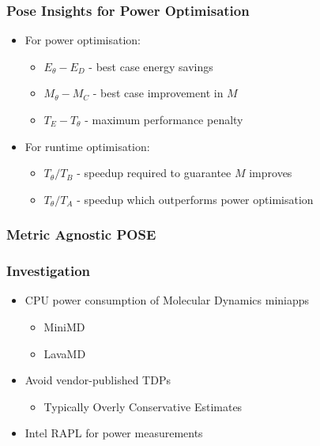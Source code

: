 \documentclass{beamer}
\begin{document}
  \begin{frame}
    \frametitle{Pose Insights for Power Optimisation}
    \begin{itemize}
      \item<1-> For power optimisation:
      \begin{itemize}
        \item $E_{\theta} - E_{D}$ - best case energy savings 
        \item $M_{\theta} - M_{C}$ - best case improvement in $M$
        \item $T_{E} - T_{\theta}$ - maximum performance penalty
      \end{itemize}
      \item<2-> For runtime optimisation:
      \begin{itemize}
        \item $T_{\theta} / T_{B}$ - speedup required to guarantee $M$ improves 
        \item $T_{\theta} / T_{A}$ - speedup which outperforms power optimisation
      \end{itemize}
    \end{itemize}
  \end{frame}

  \begin{frame}
    \frametitle{Metric Agnostic POSE}
    \begin{figure}
    \centering
    
    \end{figure}
  \end{frame}

  \begin{frame}
    \frametitle{Investigation}
    \begin{itemize}
      \item CPU power consumption of Molecular Dynamics miniapps
      \begin{itemize}
        \item MiniMD
        \item LavaMD
      \end{itemize}
      \item Avoid vendor-published TDPs
      \begin{itemize}
        \item Typically Overly Conservative Estimates
      \end{itemize}
      \item Intel RAPL for power measurements
    \end{itemize}
  \end{frame}
\end{document}
